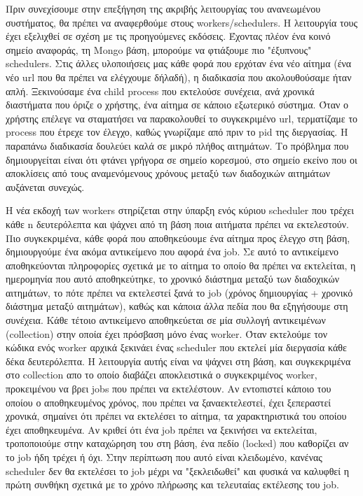 Πριν συνεχίσουμε στην επεξήγηση της ακριβής λειτουργίας του ανανεωμένου συστήματος, θα πρέπει να αναφερθούμε στους workers/schedulers. Η λειτουργία τους
έχει εξελιχθεί σε σχέση με τις προηγούμενες εκδόσεις. Έχοντας πλέον ένα κοινό σημείο αναφοράς, τη Mongo βάση, μπορούμε να φτιάξουμε πιο "έξυπνους" schedulers.
Στις άλλες υλοποιήσεις μας κάθε φορά που ερχόταν ένα νέο αίτημα (ένα νέο url που θα πρέπει να ελέγχουμε δήλαδή), η διαδικασία που ακολουθούσαμε ήταν απλή. Ξεκινούσαμε ένα child process
που εκτελούσε συνέχεια, ανά χρονικά διαστήματα που όριζε ο χρήστης, ένα αίτημα σε κάποιο εξωτερικό σύστημα. Όταν ο χρήστης επέλεγε να σταματήσει να
παρακολουθεί το συγκεκριμένο url, τερματίζαμε το process που έτρεχε τον έλεγχο, καθώς γνωρίζαμε από πριν το pid της διεργασίας.
Η παραπάνω διαδικασία δουλεύει καλά σε μικρό πλήθος αιτημάτων. Το πρόβλημα που δημιουργείται είναι ότι φτάνει γρήγορα σε σημείο κορεσμού, στο σημείο εκείνο που οι αποκλίσεις από τους αναμενόμενους
χρόνους μεταξύ των διαδοχικών αιτημάτων αυξάνεται συνεχώς.

Η νέα εκδοχή των workers στηρίζεται στην ύπαρξη ενός κύριου
scheduler που τρέχει κάθε n δευτερόλεπτα και ψάχνει από τη βάση ποια αιτήματα πρέπει να εκτελεστούν. Πιο συγκεκριμένα, κάθε φορά που αποθηκεύουμε ένα αίτημα προς έλεγχο στη βάση,
δημιουργούμε ένα ακόμα αντικείμενο που αφορά ένα job. Σε αυτό το αντικείμενο αποθηκεύονται πληροφορίες σχετικά με το αίτημα το οποίο θα πρέπει να εκτελείται, η ημερομηνία που
αυτό αποθηκεύτηκε, το χρονικό διάστημα μεταξύ των διαδοχικών αιτημάτων, το πότε πρέπει να εκτελεστεί ξανά το job (χρόνος δημιουργίας + χρονικό διάστημα μεταξύ αιτημάτων),
καθώς και κάποια άλλα πεδία που θα εξηγήσουμε στη συνέχεια. Κάθε τέτοιο αντικείμενο αποθηκεύεται σε μία συλλογή αντικειμένων (collection) στην οποία έχει πρόσβαση μόνο ένας
worker. Όταν εκτελούμε τον κώδικα ενός worker αρχικά ξεκινάει ένας scheduler που εκτελεί μία διεργασία κάθε δέκα δευτερόλεπτα. Η λειτουργία αυτής είναι να ψάχνει στη βάση,
και συγκεκριμένα στο collection απο το οποίο διαβάζει αποκλειστικά ο συγκεκριμένος worker, προκειμένου να βρει jobs που πρέπει να εκτελέστουν. Αν εντοπιστεί κάποιο του οποίου ο αποθηκευμένος χρόνος, που πρέπει να ξαναεκτελεστεί,
έχει ξεπεραστεί χρονικά, σημαίνει ότι πρέπει να εκτελέσει το αίτημα, τα χαρακτηριστικά του οποίου έχει αποθηκευμένα.
Αν κριθεί ότι ένα job πρέπει να ξεκινήσει να εκτελείται, τροποποιούμε στην καταχώρηση του στη βάση, ένα πεδίο (locked) που καθορίζει αν το job ήδη τρέχει ή όχι. Στην περίπτωση που αυτό είναι κλειδωμένο, κανένας scheduler
δεν θα εκτελέσει το job μέχρι να "ξεκλειδωθεί" και φυσικά να καλυφθεί η πρώτη συνθήκη σχετικά με το χρόνο πλήρωσης και τελευταίας εκτέλεσης του job.


